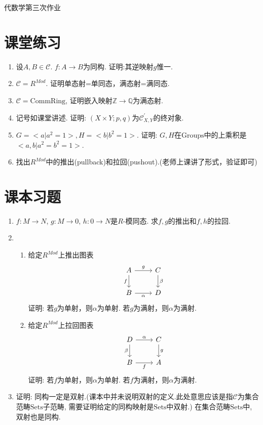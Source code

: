 \documentclass[12pt]{article}
\begin{document}
\begin{center}
            \large{代数学第三次作业}
\end{center}
\section{课堂练习}
\begin{enumerate}
    \item 设$A,B\in \mathcal{C}$. $f:A\rightarrow B$为同构. 证明:其逆映射$g$惟一.
    \item $\mathcal{C}=R^{Mod}$. 证明单态射=单同态，满态射=满同态.
    \item $\mathcal{C=\mathrm{CommRing}}$, 证明嵌入映射$\mathbb{Z}\rightarrow \mathbb{Q}$为满态射.
    \item 记号如课堂讲述. 证明: $(X\times Y;p,q)$为$\mathcal{C}^{'}_{X,Y}$的终对象.
    \item $G=<a\vert a^2=1>,H=<b\vert b^2=1>$. 证明: $G,H$在$\mathrm{Groups}$中的上乘积是$<a,b\vert a^2=b^2=1>$.
    \item 找出$R^{Mod}$中的推出(pullback)和拉回(pushout).(老师上课讲了形式，验证即可)
\end{enumerate}
\section{课本习题}
\begin{enumerate}
    \item $f:M\rightarrow N$, $g:M\rightarrow 0$, $h:0\rightarrow N$是$R$-模同态. 求$f,g$的推出和$f,h$的拉回.
    \item 
    \begin{enumerate}
        \item 给定$R^{Mod}$上推出图表
\[\begin{tikzcd}
	A & C \\
	B & D
	\arrow["g", from=1-1, to=1-2]
	\arrow["f"', from=1-1, to=2-1]
	\arrow["\beta", from=1-2, to=2-2]
	\arrow["\alpha"', from=2-1, to=2-2]
\end{tikzcd}\]
  证明: 若$g$为单射，则$\alpha$为单射. 若$g$为满射，则$\alpha$为满射.
  \item 给定$R^{Mod}$上拉回图表
\[\begin{tikzcd}
	D & C \\
	B & A
	\arrow["\alpha", from=1-1, to=1-2]
	\arrow["\beta"', from=1-1, to=2-1]
	\arrow["g", from=1-2, to=2-2]
	\arrow["f"', from=2-1, to=2-2]
\end{tikzcd}\]
证明: 若$f$为单射，则$\alpha$为单射. 若$f$为满射，则$\alpha$为满射.

    \end{enumerate}
    \item 证明: 同构一定是双射.(课本中并未说明双射的定义.此处意思应该是指$\mathcal{C}$为集合范畴$\mathrm{Sets}$子范畴, 需要证明给定的同构映射是$\mathrm{Sets}$中双射.) 在集合范畴$\mathrm{Sets}$中, 双射也是同构.
\end{enumerate}
\end{document}
